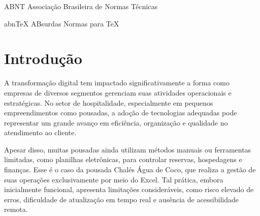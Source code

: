 \documentclass[
	12pt,				%
	openany,			%
	twoside,			%
	a4paper,			%
	english,			%
	french,				%
	spanish,			%
	brazil				%
	]{abntex2}
\renewcommand*{\cleardoublepage}{\clearpage}
\newcommand{\listofquadrosname}{Lista de quadros}
\begin{document}
\listoffigures*
\cleardoublepage
\pdfbookmark[0]{\listofquadrosname}{loq}
\listofquadros*
\cleardoublepage
\begin{siglas}
  \item[ABNT] Associação Brasileira de Normas Técnicas
  \item[abnTeX] ABsurdas Normas para TeX
\end{siglas}

\tableofcontents*
\cleardoublepage



\textual

\chapter{Introdução}

A transformação digital tem impactado significativamente a forma como empresas de diversos segmentos gerenciam suas atividades operacionais e estratégicas. No setor de hospitalidade, especialmente em pequenos empreendimentos como pousadas, a adoção de tecnologias adequadas pode representar um grande avanço em eficiência, organização e qualidade no atendimento ao cliente.

Apesar disso, muitas pousadas ainda utilizam métodos manuais ou ferramentas limitadas, como planilhas eletrônicas, para controlar reservas, hospedagens e finanças. Esse é o caso da pousada Chalés Água de Coco, que realiza a gestão de suas operações exclusivamente por meio do Excel. Tal prática, embora inicialmente funcional, apresenta limitações consideráveis, como risco elevado de erros, dificuldade de atualização em tempo real e ausência de acessibilidade remota.
\end{document}
